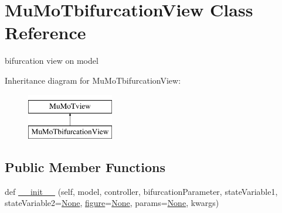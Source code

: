 \hypertarget{class_mu_mo_t_1_1_mu_mo_t_1_1_mu_mo_tbifurcation_view}{}\section{Mu\+Mo\+Tbifurcation\+View Class Reference}
\label{class_mu_mo_t_1_1_mu_mo_t_1_1_mu_mo_tbifurcation_view}


bifurcation view on model  


Inheritance diagram for Mu\+Mo\+Tbifurcation\+View\+:\begin{figure}[H]
\begin{center}
\leavevmode
\includegraphics[height=2.000000cm]{class_mu_mo_t_1_1_mu_mo_t_1_1_mu_mo_tbifurcation_view}
\end{center}
\end{figure}
\subsection*{Public Member Functions}
\begin{DoxyCompactItemize}
\item 
def \hyperlink{class_mu_mo_t_1_1_mu_mo_t_1_1_mu_mo_tbifurcation_view_ac1764fc6547304e629425a5329dc7083}{\+\_\+\+\_\+init\+\_\+\+\_\+} (self, model, controller, bifurcation\+Parameter, state\+Variable1, state\+Variable2=\hyperlink{class_mu_mo_t_1_1_mu_mo_t_1_1_mu_mo_tbifurcation_view_ac7485dcc8d256a6f197ed7802687f252}{None}, \hyperlink{class_mu_mo_t_1_1_mu_mo_t_1_1_mu_mo_tbifurcation_view_a391e34f2de441d79152a7b3d6e4c9c86}{figure}=\hyperlink{class_mu_mo_t_1_1_mu_mo_t_1_1_mu_mo_tbifurcation_view_ac7485dcc8d256a6f197ed7802687f252}{None}, params=\hyperlink{class_mu_mo_t_1_1_mu_mo_t_1_1_mu_mo_tbifurcation_view_ac7485dcc8d256a6f197ed7802687f252}{None}, kwargs)
\end{DoxyCompactItemize}

